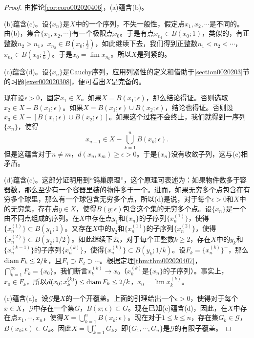 \begin{proof}
由推论\ref{cor:coro002020406}，(a)蕴含(b)。

(b)蕴含(c)。设$\{x_n\}$是$X$中的一个序列，不失一般性，假定点$x_1,x_2,\cdots$是不同的。由(b)，集合$\{x_1, x_2,\cdots\}$有一个极限点$x_0$。于是有点$x_{n_1} \in B(x_0; 1)$，类似的，有正整数$n_2 > n_1$，$x_{n_2} \in B(x_0; \frac{1}{2})$，如此继续下去，我们得到正整数$n_1 < n_2 < \cdots$，$x_{n_k} \in B(x_0;\frac{1}{k})$。于是$x_0 = \lim{x_{n_k}}$。所以$X$是列紧的。

(c)蕴含(d)。设$\{x_n\}$是Cauchy序列，应用列紧性的定义和借助于\ref{section0020203}节的习题\ref{exer002020308}，便可看出$X$是完备的。

现在设$\epsilon > 0$，固定$x_1 \in X$。如果$X = B(x_1;\epsilon)$，那么结论得证。否则选取$x_2 \in X - B(x_1; \epsilon)$。如果$X = B(x_1;\epsilon) \cup B(x_2;\epsilon)$，结论也得证。否则设$x_3 \in X - [B(x_1;\epsilon) \cup B(x_2;\epsilon)]$。如果这个过程不会终止，我们就得到一序列$\{x_n\}$，使得
\[
x_{n+1} \in X - \bigcup_{k=1}^{n}{B(x_k; \epsilon)}.
\]
但是这蕴含对于$n \neq m$，$d(x_n, x_m) \ge \epsilon > 0$。于是$\{x_n\}$没有收敛子列，这与(c)相矛盾。

(d)蕴含(c)。这部分证明用到“鸽巢原理”，这个原理可表述为：如果物件数多于容器数，那么至少有一个容器里装的物件多于一个。进而，如果无穷多个点包含在有穷多个球里，那么有一个球包含无穷多个点，所以(d)是说，对于每个$\epsilon > 0$和$X$中的无穷集，存在点$y \in X$，使得$B(y; \epsilon)$包含这个集的无穷多个点。设$\{x_n\}$是一个由不同点组成的序列。在$X$中存在点$y_1$和$\{x_n\}$的子序列$\{x_{n}^{(1)}\}$，使得$\{x_n^{(1)}\} \subset B(y_1;1)$。又存在$X$中的$y_2$和$\{x_n^{(1)}\}$的子序列$\{x_n^{(2)}\}$，使得$\{x_n^{(2)}\} \subset B(y_2; 1/2)$。如此继续下去，对于每个正整数$k \ge 2$，存在$X$中的$y_k$和$\{x_n^{(k-1)}\}$的子序列$\{x_n^{(k)}\}$，使得$\{x_n^{(k)}\} \subset B(y_k; 1/k)$。设$F_k = \{x_n^{(k)}\}^-$，那么$\operatorname{diam}{F_k} \le 2/k$，且$F_1 \supset F_2 \supset \cdots$。根据定理\ref{thm:thm002020407}，$\bigcap_{k=1}^{\infty}{F_k} = \{x_0\}$。我们断言$x_k^{(k)} \to x_0$（$x_k^{(k)}$是$\{x_n\}$的子序列）。事实上，$x_0 \in F_k$，所以$d(x_0;x_k^{(k)}) \le \operatorname{diam}{F_k} \le 2/k$，$x_0 = \lim{x_k^{(k)}}$。

(c)蕴含(a)。设$\mathscr{G}$是$X$的一个开覆盖。上面的引理给出一个$\epsilon > 0$，使得对于每个$x \in X$，$\mathscr{G}$中存在一个集$G$，$B(x; \epsilon) \subset G$。现在已知(c)蕴含(d)，因此，在$X$中存在点$x_1, \cdots, x_n$，使得$X = \bigcup_{k=1}^{n}{B(x_k;\epsilon)}$。现在对于$1 \le k \le n$，存在集$G_k \in \mathscr{G}$，$B(x_k;\epsilon) \subset G_k$。因此$X = \bigcup_{k=1}^{n}{G_k}$，即$\{G_1,\cdots, G_n\}$是$\mathscr{G}$的有限子覆盖。
\end{proof}

